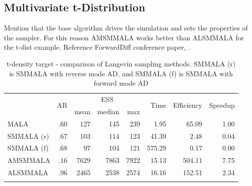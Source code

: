 \documentclass[twoside,11pt]{article}
\begin{document}
\newpage
\subsection{Multivariate t-Distribution}

Mention that the base algorithm drives the simulation and sets the properties of the sampler. For this reason AMSMMALA works
better than ALSMMALA for the t-dist example. Reference ForwardDiff conference paper, \cite{rev_lub_pap__for}.

\begin{table}
	\caption{t-density target - comparison of Langevin sampling methods. SMMALA (r) is SMMALA with reverse mode AD, and 
	SMMALA (f) is SMMALA with forward mode AD}
	\label{tab:t}
	\begin{tabular}{l|r|rrr|r|r|r}
		\hline\noalign{\smallskip}
		\multirow{2}{*}{Method} &
		\multirow{2}{*}{AR} &
		\multicolumn{3}{c|}{ESS} &
		\multirow{2}{*}{Time} &
		\multirow{2}{*}{Efficiency} &
		\multirow{2}{*}{Speedup} \\
		& & mean & median & max & & & \\
		\noalign{\smallskip}\hline\noalign{\smallskip}
		MALA & .60 & 127 & 145 & 239 & 1.95 & 65.09 & 1.00 \\
		SMMALA (r) & .67 & 103 & 114 & 123 & 41.39 & 2.48 & 0.04 \\
		SMMALA (f) & .68 & 97 & 104 & 121 & 575.29 & 0.17 & 0.00 \\
		AMSMMALA & .16 & 7629 & 7863 & 7922 & 15.13 & 504.11 & 7.75 \\
		ALSMMALA & .96 & 2465 & 2538 & 2574 & 16.16 & 152.51 & 2.34 \\	
		\noalign{\smallskip}\hline
	\end{tabular}
\end{table}
\end{document}
